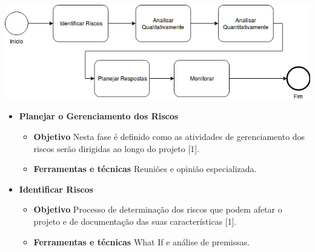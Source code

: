 \begin{apendicesenv}
\begin{center}
	\includegraphics[scale=0.5]{figuras/processo-gerencia-riscos}
\end{center}

\begin{itemize}
    \item \textbf{Planejar o Gerenciamento dos Riscos}
        \begin{itemize}
            \item \textbf{Objetivo}
            Nesta fase é definido como as atividades de gerenciamento dos riscos serão dirigidas ao longo do projeto [1].
            \item \textbf{Ferramentas e técnicas}
            Reuniões e opinião especializada.
        \end{itemize}
    
    \item \textbf{Identificar Riscos}
        \begin{itemize}
            \item \textbf{Objetivo}
            Processo de determinação dos riscos que podem afetar o projeto e de documentação das suas características [1].
            \item \textbf{Ferramentas e técnicas}
            What If e análise de premissas.
        \end{itemize}


\end{itemize}
\end{apendicesenv}

